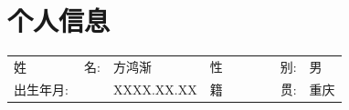     \begin{figure}[h]
        \begin{minipage}{0.82\textwidth}
            \section{\makebox[\widthof{\faAddressCard}][cc]{\color{SWU_Blue}{\faAddressCard}}\quad 个人信息}
            \begin{tabularx}{\linewidth}{p{}Xp{}X}
                姓\ \ \ \ \ \ \ \ \ 名: & 方鸿渐 & 
                性\ \ \ \ \ \ \ \ \ 别: & 男  \\
                出生年月: & XXXX.XX.XX & 
                籍\ \ \ \ \ \ \ \ \ 贯: & 重庆  \\
            \end{tabularx}
        \end{minipage}
    \hspace{2em}
    \begin{minipage}{0.12\textwidth}
        \setlength{\fboxsep}{0pt}
    \end{minipage}
    \end{figure}
    \vspace{-1.5em}


